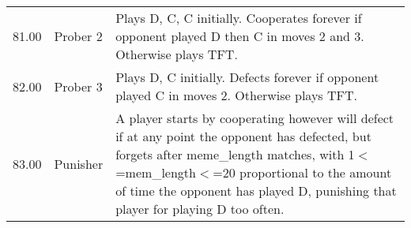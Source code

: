\begin{table}[!hbtp]
\begin{adjustbox}{width=2\textwidth, angle=90}
\begin{tabular}{rll}
	81.00  & Prober 2                    & Plays D, C, C initially. Cooperates forever if opponent played D then C
	in moves 2 and 3. Otherwise plays TFT.                                                                                                                                                                                                                                                                                                                                                                                                                                                                                                                                                                                                                                                                                                                                                                                                                                                                                                       \\
	82.00  & Prober 3                    & Plays D, C initially. Defects forever if opponent played C in moves 2.
	Otherwise plays TFT.                                                                                                                                                                                                                                                                                                                                                                                                                                                                                                                                                                                                                                                                                                                                                                                                                                                                                                                          \\
	83.00  & Punisher                    & A player starts by cooperating however will defect if at any point the
	opponent has defected, but forgets after meme\_length matches, with
	1\ensuremath{<}=mem\_length\ensuremath{<}=20 proportional to the amount of time the opponent has
	played D, punishing that player for playing D too often.                                                                                                                                                                                                                                                                                                                                                                                                                                                                                                                                                                                                                                                                                                                                     \\

\end{tabular}
\end{adjustbox}
\end{table}

